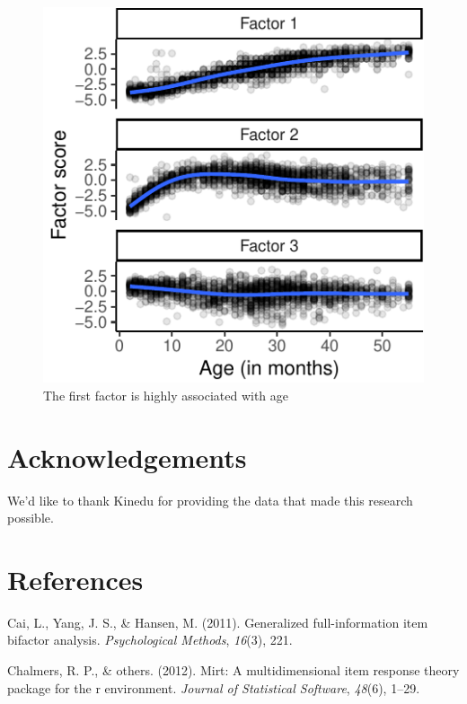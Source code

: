 \documentclass[10pt, letterpaper]{article}
\newenvironment{CodeChunk}{}{}
\begin{document}
\begin{CodeChunk}
\begin{figure}[tb]
\includegraphics{figs/factorscores-1} \caption[The first factor is highly associated with age]{The first factor is highly associated with age}\label{fig:factorscores}
\end{figure}
\end{CodeChunk}

\hypertarget{acknowledgements}{%
\section{Acknowledgements}\label{acknowledgements}}

We'd like to thank Kinedu for providing the data that made this research
possible.

\hypertarget{references}{%
\section{References}\label{references}}

\setlength{\parindent}{-0.1in} 
\setlength{\leftskip}{0.125in}

\noindent

\hypertarget{refs}{}
\leavevmode\hypertarget{ref-cai2011generalized}{}%
Cai, L., Yang, J. S., \& Hansen, M. (2011). Generalized full-information
item bifactor analysis. \emph{Psychological Methods}, \emph{16}(3), 221.

\leavevmode\hypertarget{ref-chalmers2012mirt}{}%
Chalmers, R. P., \& others. (2012). Mirt: A multidimensional item
response theory package for the r environment. \emph{Journal of
Statistical Software}, \emph{48}(6), 1--29.
\end{document}
